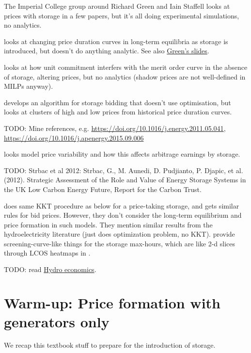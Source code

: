 \documentclass[final,3p,times]{elsarticle}
\begin{document}
The Imperial College group around Richard Green and Iain Staffell looks at prices with storage in a few papers, but it's all doing experimental simulations, no analytics.

\cite{Green2015} looks at changing price duration curves in long-term equilibria as storage is introduced, but doesn't do anything analytic. See also \href{https://spiral.imperial.ac.uk/handle/10044/1/51138}{Green's slides}.


\cite{Staffell2016} looks at how unit commitment interfers with the merit order curve in the absence of storage, altering prices, but no analytics (shadow prices are not well-defined in MILPs anyway).

\cite{Ward2018} develops an algorithm for storage bidding that doesn't use optimisation, but looks at clusters of high and low prices from historical price duration curves.

TODO: Mine \cite{Ward2018} references, e.g. \url{https://doi.org/10.1016/j.energy.2011.05.041}, \url{https://doi.org/10.1016/j.apenergy.2015.09.006}

\cite{Ward2019} looks model price variability and how this affects arbitrage earnings by storage.

TODO: Strbac et al 2012: Strbac, G., M. Aunedi, D. Pudjianto, P. Djapic, et al. (2012). Strategic Assessment of the Role and Value of
Energy Storage Systems in the UK Low Carbon Energy Future, Report for the Carbon Trust.

\cite{CRAMPES2019100746} does same KKT procedure as below for a price-taking storage, and gets similar rules for bid prices. However, they don't consider the long-term equilibrium and price formation in such models. They mention similar results from the hydroelectricity literature \cite{lederer1984overall} (just does optimization problem, no KKT). \cite{CRAMPES2019100746} provide screening-curve-like things for the storage max-hours, which are like 2-d slices through LCOS heatmaps in \cite{schmidtmelchior2019}.

TODO: read \href{https://www.uio.no/studier/emner/sv/oekonomi/ECON4930/v11/undervisningsmateriale/Hydropower%20economics4.pdf}{Hydro economics}.



\section{Warm-up: Price formation with generators only}\label{sec:generators}

We recap this textbook stuff to prepare for the introduction of storage.
\end{document}
